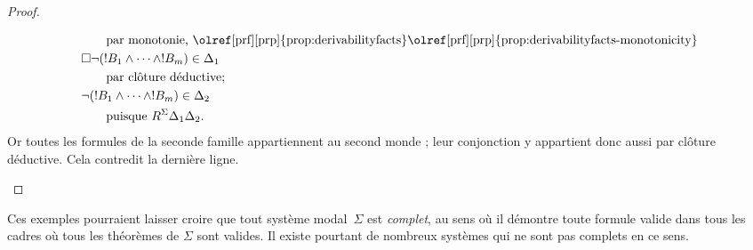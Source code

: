 \documentclass[../../../include/open-logic-section]{subfiles}
\begin{document}
\begin{proof}
\begin{enumerate}
\begin{align*}
      &\qquad\text{par monotonie, \olref[prf][prp]{prop:derivabilityfacts}\olref[prf][prp]{prop:derivabilityfacts-monotonicity}} \\
      & \Box\lnot (!B_1 \land \dots \land !B_m) \in \Delta_1\\
      &\qquad\text{par clôture déductive} ; \\
      & \lnot (!B_1 \land \dots \land !B_m) \in \Delta_2\\
      &\qquad \text{puisque }
      R^\Sigma \Delta_1\Delta_2.
    \end{align*}
    Or toutes les formules de la seconde famille appartiennent au
    second monde ; leur conjonction y appartient donc aussi par clôture
    déductive. Cela contredit la dernière ligne.
  \end{enumerate}
\end{proof}

Ces exemples pourraient laisser croire que tout système modal~$\Sigma$
est \emph{complet}, au sens où il démontre toute formule valide dans
tous les cadres où tous les théorèmes de $\Sigma$ sont valides. Il existe pourtant
de nombreux systèmes qui ne sont pas complets en ce sens.
\end{document}
